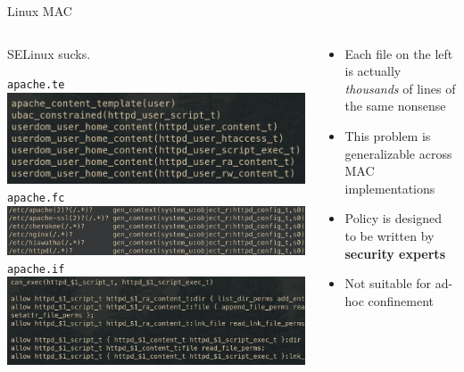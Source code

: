 \documentclass[12pt, dvipsnames, aspectratio=169]{beamer}
\begin{document}
\begin{frame}[c]{Linux MAC}
\begin{columns}[c]
    \begin{column}{0.4\textwidth}
        {\large SELinux sucks.}
        \begin{center}
            \tiny \texttt{apache.te}\\
            \includegraphics[width=1\textwidth]{figs/mac/selinux-sucks1.png}\\
            \texttt{apache.fc}\\
            \includegraphics[width=1\textwidth]{figs/mac/selinux-sucks2.png}\\
            \texttt{apache.if}\\
            \includegraphics[width=1\textwidth]{figs/mac/selinux-sucks3.png}
        \end{center}
    \end{column}
    \begin{column}{0.4\textwidth}
        \begin{itemize}
            \item Each file on the left is actually \textit{thousands} of lines
            of the same nonsense
            \item This problem is generalizable across MAC implementations
            \item Policy is designed to be written by \textbf{security experts}
            \item Not suitable for ad-hoc confinement
        \end{itemize}
    \end{column}
\end{columns}
\end{frame}
\end{document}
